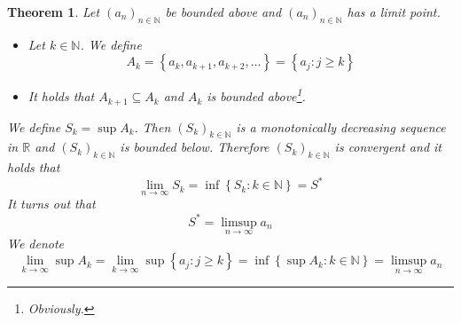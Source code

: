 \documentclass[a4paper,landscape,twocolumn]{article}
\newtheorem{theorem}{Theorem}
\newcommand\set[1]{\left\{#1\right\}}
\newcommand\seq[1]{{\left(#1\right)}_{n \in \mathbb N}}
\begin{document}
\begin{theorem}
  Let $\seq{a_n}$ be bounded above and $\seq{a_n}$ has a limit point.
  \begin{itemize}
    \item Let $k \in \mathbb N$. We define
      \[ A_k = \set{a_k, a_{k+1}, a_{k+2}, \dots} = \set{a_j: j \geq k} \]
    \item It holds that $A_{k+1} \subseteq A_k$ and $A_k$ is bounded above\footnote{Obviously.}.
  \end{itemize}
  We define $S_k = \sup{A_k}$. Then $\left(S_k\right)_{k\in\mathbb N}$ is a monotonically decreasing
  sequence in $\mathbb R$ and $\left(S_k\right)_{k\in\mathbb N}$ is bounded below.
  Therefore $\left(S_k\right)_{k\in\mathbb N}$ is convergent and it holds that
  \[ \lim_{n\to\infty} S_k = \inf\set{S_k: k \in \mathbb N} = S^* \]
  It turns out that
  \[ S^* = \limsup_{n\to\infty} a_n \]
  We denote
  \[
      \lim_{k\to\infty} \sup{A_k}
      = \lim_{k\to\infty} \sup \set{a_j: j \geq k}
      = \inf\set{\sup{A_k}: k \in \mathbb N}
      = \limsup_{n\to\infty} a_n
  \]
\end{theorem}
\end{document}
